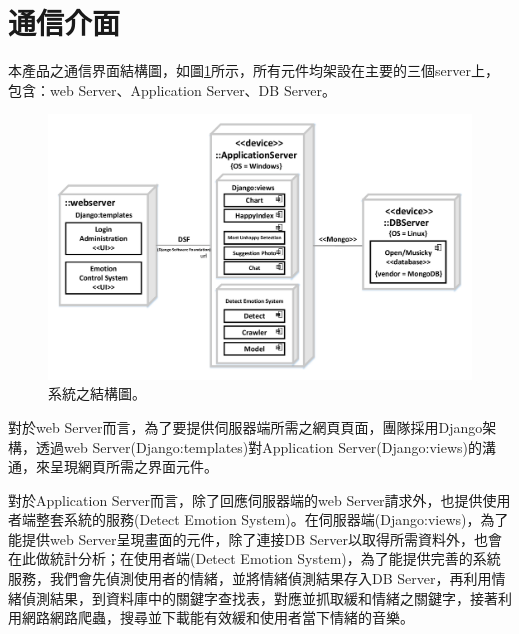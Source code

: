 \documentclass[12pt]{scrreprt}
\begin{document}
\section{通信介面} %

本產品之通信界面結構圖，如圖\ref{fig:StructuralDiagram}所示，所有元件均架設在主要的三個server上，包含：web Server、Application Server、DB Server。

\begin{figure}[!h]
\begin{center}
\includegraphics[width=.78\textwidth]{./figs/diagrams/StructuralDiagram.pdf}
\end{center}
\vspace{-0.5cm}
\caption{系統之結構圖。}
\label{fig:StructuralDiagram}
\end{figure}

對於web Server而言，為了要提供伺服器端所需之網頁頁面，團隊採用Django架構，透過web Server(Django:templates)對Application Server(Django:views)的溝通，來呈現網頁所需之界面元件。

對於Application Server而言，除了回應伺服器端的web Server請求外，也提供使用者端整套系統的服務(Detect Emotion System)。在伺服器端(Django:views)，為了能提供web Server呈現畫面的元件，除了連接DB Server以取得所需資料外，也會在此做統計分析；在使用者端(Detect Emotion System)，為了能提供完善的系統服務，我們會先偵測使用者的情緒，並將情緒偵測結果存入DB Server，再利用情緒偵測結果，到資料庫中的關鍵字查找表，對應並抓取緩和情緒之關鍵字，接著利用網路網路爬蟲，搜尋並下載能有效緩和使用者當下情緒的音樂。
\end{document}
